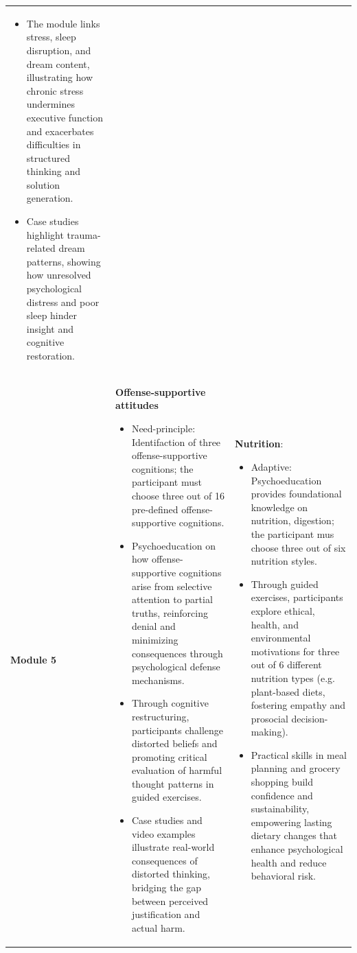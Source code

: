 \documentclass[
  super,
  preprint,
  1p,
  onecolumn]{elsarticle}
\begin{document}
\begin{table}
{\begin{tabular*}{\linewidth}{@{\extracolsep{\fill}}lll}
\begin{itemize}
\item The module links stress, sleep disruption, and dream content, illustrating how chronic stress undermines executive function and exacerbates difficulties in structured thinking and solution generation.

\item Case studies highlight trauma-related dream patterns, showing how unresolved psychological distress and poor sleep hinder insight and cognitive restoration.

\end{itemize} \\ 
\textbf{Module 5} & \textbf{Offense-supportive attitudes}

\begin{itemize}
\item Need-principle: Identifaction of three offense-supportive cognitions; the participant must choose three out of 16 pre-defined offense-supportive cognitions.

\item Psychoeducation on how offense-supportive cognitions arise from selective attention to partial truths, reinforcing denial and minimizing consequences through psychological defense mechanisms.

\item Through cognitive restructuring, participants challenge distorted beliefs and promoting critical evaluation of harmful thought patterns in guided exercises.

\item Case studies and video examples illustrate real-world consequences of distorted thinking, bridging the gap between perceived justification and actual harm.

\end{itemize} & \textbf{Nutrition}:

\begin{itemize}
\item Adaptive: Psychoeducation provides foundational knowledge on nutrition, digestion; the participant mus choose three out of six nutrition styles.

\item Through guided exercises, participants explore ethical, health, and environmental motivations for three out of 6 different nutrition types (e.g. plant-based diets, fostering empathy and prosocial decision-making).

\item Practical skills in meal planning and grocery shopping build confidence and sustainability, empowering lasting dietary changes that enhance psychological health and reduce behavioral risk.


\end{itemize}
\end{tabular*}}
\end{table}
\end{document}
